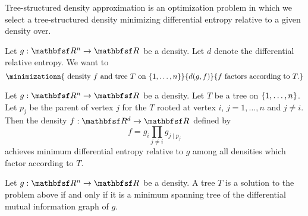 

Tree-structured density
approximation is an
optimization problem in which we
select a tree-structured density
minimizing differential entropy
relative to a given density over.


Let $g: \R^n \to \R$ be a density.
Let $d$ denote the differential
relative entropy.
We want to
\[
  \minimizationn{
    \text{ density } f \text{ and tree } T \text{ on } \set{1, \dots, n}
  }{
    d(g, f)
  }{
    f \text{ factors according to } T.
  }
\]


\begin{prop}
  Let $g: \R^n \to \R$ be a density.
  Let $T$ be
  a tree on $\{1, \dots, n\}$.
  Let $p_j$ be
  the parent of vertex $j$ for the $T$ rooted
  at vertex $i$, $j = 1,\dots,n$ and $j \neq i$.
  Then the density $f: \R^d \to \R$ defined by
  \[
    f = g_i \prod_{j \neq i} g_{j \mid p_j}
  \]
  achieves minimum differential entropy relative to $g$ among
  all densities which factor according to $T$.
\end{prop}

\begin{prop}
  Let $g: \R^n \to \R$ be a density.
  A tree $T$ is a solution to the problem above
  if and only if it is a minimum spanning
  tree of the differential mutual information graph of $g$.
\end{prop}
\strats
